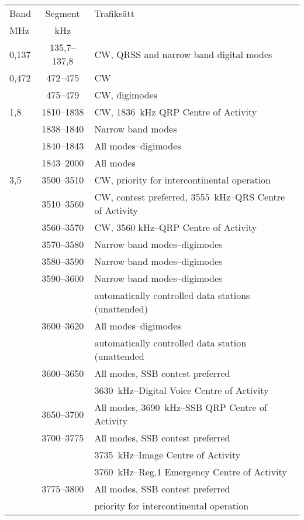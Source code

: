 \setlongtables
\begin{longtable}{lcl}
Band & Segment & Trafiksätt \\
MHz  & kHz     & \\ \hline
\endhead

0,137 & 135,7--137,8 & CW, QRSS and narrow band digital modes\\

0,472 & 472--475 & CW\\
 & 475--479 & CW, digimodes\\
 
1,8  & 1810--1838 & CW, 1836~kHz QRP Centre of Activity\\
     & 1838--1840 & Narrow band modes\\
     & 1840--1843 & All modes--digimodes\\
     & 1843--2000 & All modes\\

3,5  & 3500--3510 & CW, priority for intercontinental operation\\
     & 3510--3560 & CW, contest preferred, 3555~kHz--QRS Centre of Activity\\
     & 3560--3570 & CW, 3560 kHz--QRP Centre of Activity\\
     & 3570--3580 & Narrow band modes--digimodes\\
     & 3580--3590 & Narrow band modes--digimodes\\
     & 3590--3600 & Narrow band modes--digimodes\\
     & & automatically controlled data stations (unattended)\\
     & 3600--3620 & All modes--digimodes\\
     & & automatically controlled data station (unattended\\
     & 3600--3650 & All modes, SSB contest preferred\\
     & & 3630~kHz--Digital Voice Centre of Activity\\
     & 3650--3700 & All modes, 3690~kHz--SSB QRP Centre of Activity\\
     & 3700--3775 & All modes, SSB contest preferred\\
     & & 3735~kHz--Image Centre of Activity\\
     & & 3760~kHz--Reg.1 Emergency Centre of Activity\\
     & 3775--3800 & All modes, SSB contest preferred\\
     & & priority for intercontinental operation\\
     

\end{longtable}
